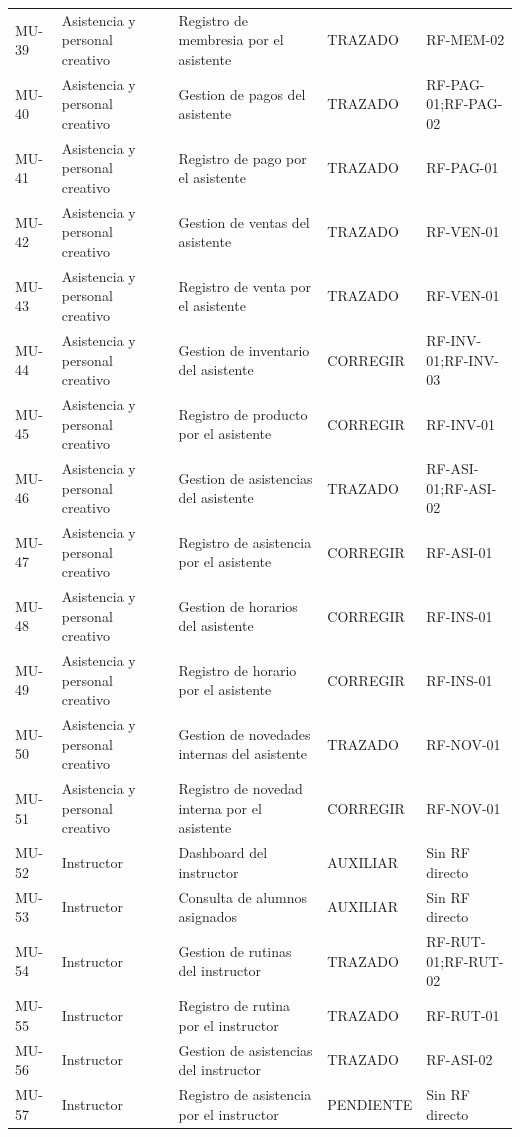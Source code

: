 \documentclass[11pt,a4paper,twoside]{article}
\begin{document}
\begin{longtable}{p{1.0cm}p{2.7cm}p{3.0cm}p{3.1cm}p{2.8cm}}
MU-39 & Asistencia y personal creativo & Registro de membresia por el asistente & TRAZADO & RF-MEM-02 \\
MU-40 & Asistencia y personal creativo & Gestion de pagos del asistente & TRAZADO & RF-PAG-01;RF-PAG-02 \\
MU-41 & Asistencia y personal creativo & Registro de pago por el asistente & TRAZADO & RF-PAG-01 \\
MU-42 & Asistencia y personal creativo & Gestion de ventas del asistente & TRAZADO & RF-VEN-01 \\
MU-43 & Asistencia y personal creativo & Registro de venta por el asistente & TRAZADO & RF-VEN-01 \\
MU-44 & Asistencia y personal creativo & Gestion de inventario del asistente & CORREGIR & RF-INV-01;RF-INV-03 \\
MU-45 & Asistencia y personal creativo & Registro de producto por el asistente & CORREGIR & RF-INV-01 \\
MU-46 & Asistencia y personal creativo & Gestion de asistencias del asistente & TRAZADO & RF-ASI-01;RF-ASI-02 \\
MU-47 & Asistencia y personal creativo & Registro de asistencia por el asistente & CORREGIR & RF-ASI-01 \\
MU-48 & Asistencia y personal creativo & Gestion de horarios del asistente & CORREGIR & RF-INS-01 \\
MU-49 & Asistencia y personal creativo & Registro de horario por el asistente & CORREGIR & RF-INS-01 \\
MU-50 & Asistencia y personal creativo & Gestion de novedades internas del asistente & TRAZADO & RF-NOV-01 \\
MU-51 & Asistencia y personal creativo & Registro de novedad interna por el asistente & CORREGIR & RF-NOV-01 \\
MU-52 & Instructor & Dashboard del instructor & AUXILIAR & Sin RF directo \\
MU-53 & Instructor & Consulta de alumnos asignados & AUXILIAR & Sin RF directo \\
MU-54 & Instructor & Gestion de rutinas del instructor & TRAZADO & RF-RUT-01;RF-RUT-02 \\
MU-55 & Instructor & Registro de rutina por el instructor & TRAZADO & RF-RUT-01 \\
MU-56 & Instructor & Gestion de asistencias del instructor & TRAZADO & RF-ASI-02 \\
MU-57 & Instructor & Registro de asistencia por el instructor & PENDIENTE & Sin RF directo \\

\end{longtable}
\end{document}
